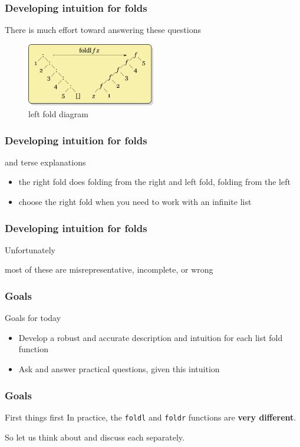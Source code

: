 \begin{frame}
\frametitle{Developing intuition for folds}
\begin{block}{There is much effort toward answering these questions}
\begin{figure}
\centering
\includegraphics[width=0.5\textwidth]{image/Left-fold-transformation.png}
\caption{left fold diagram}
\end{figure}
\end{block}
\end{frame}

\begin{frame}
\frametitle{Developing intuition for folds}
\begin{block}{and terse explanations}
\begin{itemize}
\item<1-> the right fold does folding from the right and left fold, folding from the left
\item<2-> choose the right fold when you need to work with an infinite list 
\end{itemize}
\end{block}
\end{frame}

\begin{frame}[fragile]
\frametitle{Developing intuition for folds}
\begin{block}{Unfortunately}
\begin{center}
most of these are misrepresentative, incomplete, or wrong
\end{center}
\end{block}
\end{frame}

\begin{frame}
\frametitle{Goals}
\begin{block}{Goals for today}
\begin{itemize}
\item Develop a robust and accurate description and intuition for each list fold function
\item Ask and answer practical questions, given this intuition
\end{itemize}
\end{block}
\end{frame}

\begin{frame}
\frametitle{Goals}
\begin{block}{First things first}
\center
In practice, the \lstinline[basicstyle=\ttfamily]$foldl$ and \lstinline[basicstyle=\ttfamily]$foldr$ functions are \textbf{very different}.
\end{block}
So let us think about and discuss each separately.
\end{frame}

